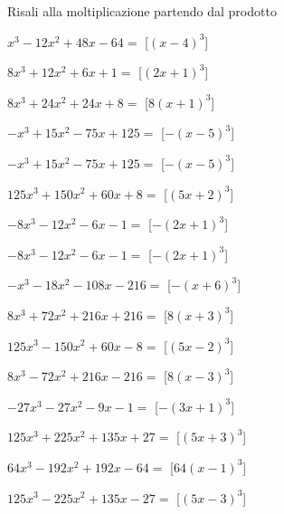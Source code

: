 \begin{esercizio}
 \label{ese:11.11}
Risali alla moltiplicazione partendo dal prodotto

\begin{multicols}{2}
\begin{enumeratea}
\spazielenx
\item \(x^{3} - 12 x^{2} + 48 x - 64=\) 
\hfill [\(\left(x - 4\right)^{3}\)]
\item \(8 x^{3} + 12 x^{2} + 6 x + 1=\) 
\hfill [\(\left(2 x + 1\right)^{3}\)]
\item \(8 x^{3} + 24 x^{2} + 24 x + 8=\) 
\hfill [\(8 \left(x + 1\right)^{3}\)]
\item \(- x^{3} + 15 x^{2} - 75 x + 125=\) 
\hfill [\(- \left(x - 5\right)^{3}\)]
\item \(- x^{3} + 15 x^{2} - 75 x + 125=\) 
\hfill [\(- \left(x - 5\right)^{3}\)]
\item \(125 x^{3} + 150 x^{2} + 60 x + 8=\) 
\hfill [\(\left(5 x + 2\right)^{3}\)]
\item \(- 8 x^{3} - 12 x^{2} - 6 x - 1=\) 
\hfill [\(- \left(2 x + 1\right)^{3}\)]
\item \(- 8 x^{3} - 12 x^{2} - 6 x - 1=\) 
\hfill [\(- \left(2 x + 1\right)^{3}\)]
\item \(- x^{3} - 18 x^{2} - 108 x - 216=\) 
\hfill [\(- \left(x + 6\right)^{3}\)]
\item \(8 x^{3} + 72 x^{2} + 216 x + 216=\) 
\hfill [\(8 \left(x + 3\right)^{3}\)]
\item \(125 x^{3} - 150 x^{2} + 60 x - 8=\) 
\hfill [\(\left(5 x - 2\right)^{3}\)]
\item \(8 x^{3} - 72 x^{2} + 216 x - 216=\) 
\hfill [\(8 \left(x - 3\right)^{3}\)]
\item \(- 27 x^{3} - 27 x^{2} - 9 x - 1=\) 
\hfill [\(- \left(3 x + 1\right)^{3}\)]
\item \(125 x^{3} + 225 x^{2} + 135 x + 27=\) 
\hfill [\(\left(5 x + 3\right)^{3}\)]
\item \(64 x^{3} - 192 x^{2} + 192 x - 64=\) 
\hfill [\(64 \left(x - 1\right)^{3}\)]
\item \(125 x^{3} - 225 x^{2} + 135 x - 27=\) 
\hfill [\(\left(5 x - 3\right)^{3}\)]

\end{enumeratea}
\end{multicols}
\end{esercizio}

